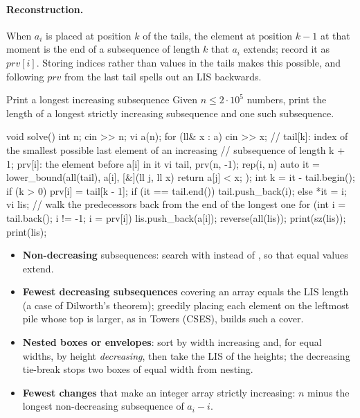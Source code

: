 \paragraph{Reconstruction.} When $a_i$ is placed at position $k$ of the tails, the element at position $k - 1$ at that moment is
the end of a subsequence of length $k$ that $a_i$ extends; record it as $\mathit{prv}[i]$. Storing indices rather than values in the
tails makes this possible, and following $\mathit{prv}$ from the last tail spells out an LIS backwards.

\begin{problem}{Print a longest increasing subsequence}
Given $n \le 2 \cdot 10^5$ numbers, print the length of a longest strictly increasing subsequence and one such subsequence.
\end{problem}

\begin{code}
void solve() {
    int n;
    cin >> n;
    vi a(n);
    for (ll& x : a) cin >> x;
    // tail[k]: index of the smallest possible last element of an increasing
    // subsequence of length k + 1; prv[i]: the element before a[i] in it
    vi tail, prv(n, -1);
    rep(i, n) {
        auto it = lower_bound(all(tail), a[i],
                              [&](ll j, ll x) { return a[j] < x; });
        int k = it - tail.begin();
        if (k > 0) prv[i] = tail[k - 1];
        if (it == tail.end()) tail.push_back(i);
        else *it = i;
    }
    vi lis;  // walk the predecessors back from the end of the longest one
    for (int i = tail.back(); i != -1; i = prv[i]) lis.push_back(a[i]);
    reverse(all(lis));
    print(sz(lis));
    print(lis);
}
\end{code}


\begin{trick}
\begin{itemize}
  \item \textbf{Non-decreasing} subsequences: search with  instead of , so that equal values extend.
  \item \textbf{Fewest decreasing subsequences} covering an array equals the LIS length (a case of Dilworth's theorem); greedily
        placing each element on the leftmost pile whose top is larger, as in Towers (CSES), builds such a cover.
  \item \textbf{Nested boxes or envelopes}: sort by width increasing and, for equal widths, by height \emph{decreasing}, then take
        the LIS of the heights; the decreasing tie-break stops two boxes of equal width from nesting.
  \item \textbf{Fewest changes} that make an integer array strictly increasing: $n$ minus the longest non-decreasing subsequence
        of $a_i - i$.
\end{itemize}
\end{trick}

